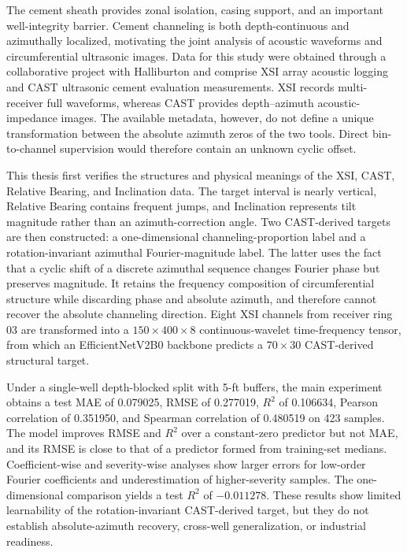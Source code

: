 \documentclass[master]{thesis-uestc}
\begin{document}
\begin{englishabstract}
The cement sheath provides zonal isolation, casing support, and an important well-integrity barrier. Cement channeling is both depth-continuous and azimuthally localized, motivating the joint analysis of acoustic waveforms and circumferential ultrasonic images. Data for this study were obtained through a collaborative project with Halliburton and comprise XSI array acoustic logging and CAST ultrasonic cement evaluation measurements. XSI records multi-receiver full waveforms, whereas CAST provides depth--azimuth acoustic-impedance images. The available metadata, however, do not define a unique transformation between the absolute azimuth zeros of the two tools. Direct bin-to-channel supervision would therefore contain an unknown cyclic offset.

This thesis first verifies the structures and physical meanings of the XSI, CAST, Relative Bearing, and Inclination data. The target interval is nearly vertical, Relative Bearing contains frequent jumps, and Inclination represents tilt magnitude rather than an azimuth-correction angle. Two CAST-derived targets are then constructed: a one-dimensional channeling-proportion label and a rotation-invariant azimuthal Fourier-magnitude label. The latter uses the fact that a cyclic shift of a discrete azimuthal sequence changes Fourier phase but preserves magnitude. It retains the frequency composition of circumferential structure while discarding phase and absolute azimuth, and therefore cannot recover the absolute channeling direction. Eight XSI channels from receiver ring 03 are transformed into a $150\times400\times8$ continuous-wavelet time-frequency tensor, from which an EfficientNetV2B0 backbone predicts a $70\times30$ CAST-derived structural target.

Under a single-well depth-blocked split with 5-ft buffers, the main experiment obtains a test MAE of 0.079025, RMSE of 0.277019, $R^2$ of 0.106634, Pearson correlation of 0.351950, and Spearman correlation of 0.480519 on 423 samples. The model improves RMSE and $R^2$ over a constant-zero predictor but not MAE, and its RMSE is close to that of a predictor formed from training-set medians. Coefficient-wise and severity-wise analyses show larger errors for low-order Fourier coefficients and underestimation of higher-severity samples. The one-dimensional comparison yields a test $R^2$ of $-0.011278$. These results show limited learnability of the rotation-invariant CAST-derived target, but they do not establish absolute-azimuth recovery, cross-well generalization, or industrial readiness.

\end{englishabstract}
\end{document}
